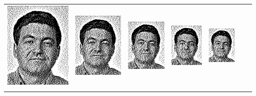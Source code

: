 \begin{tabular}{lllllll}
	\includegraphics{Ediphoto-5-3.png} &
	\includegraphics{Ediphoto-5-4.png} &
	\includegraphics{Ediphoto-5-5.png} &
	\includegraphics{Ediphoto-5-6.png} &
	\includegraphics{Ediphoto-5-7.png} \\
	 &
	 &
	 &
	 &
	 &
	 &
	 \\
\end{tabular}


